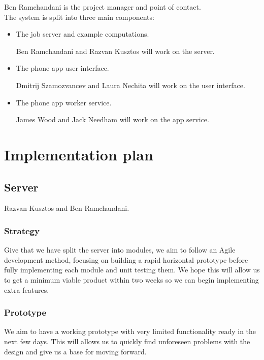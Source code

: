 \documentclass[
  twoside,
  10pt, a4paper
]{article}
\begin{document}
Ben Ramchandani is the project manager and point of contact.\\

The system is split into three main components:
\begin{itemize}
\item The job server and example computations.

Ben Ramchandani and Razvan Kusztos will work on the server.

\item The phone app user interface.

Dmitrij Szamozvancev and Laura Nechita will work on the user interface.

\item The phone app worker service.

James Wood and Jack Needham will work on the app service.
\end{itemize}



\newpage
\section{Implementation plan}


\subsection{Server}

Razvan Kusztos and Ben Ramchandani.

\subsubsection{Strategy}

Give that we have split the server into modules, we aim to follow an Agile development method, focusing on building a rapid horizontal prototype before fully implementing each module
and unit testing them. We hope this will allow us to get a minimum viable product within two weeks so we can begin implementing extra features.

\subsubsection{Prototype}

We aim to have a working prototype with very limited functionality ready in the next few days.
This will allows us to quickly find unforeseen problems with the design and give us a base for moving forward.\\
\end{document}
